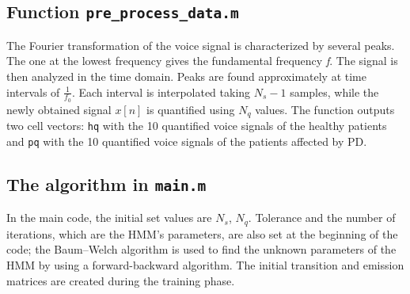 \documentclass[12pt]{article}
\begin{document}
\subsection{Function \texttt{pre\_process\_data.m}}
The Fourier transformation of the voice signal is characterized by several peaks. The one at the lowest frequency gives the fundamental frequency \textit{f}. The signal is then analyzed in the time domain. Peaks are found approximately at time intervals of $\frac{1}{f_{0}}$. Each interval is interpolated taking $N_{s}-1$ samples, while the newly obtained signal $x[n]$ is quantified using $N_{q}$ values. The function outputs two cell vectors: \texttt{hq} with the 10 quantified voice signals of the healthy patients and \texttt{pq} with the 10 quantified voice signals of the patients affected by PD.

\subsection{The algorithm in \texttt{main.m}}


In the main code, the initial set values are $N_{s}$, $N_{q}$. Tolerance and the number of iterations, which are the HMM's parameters, are also set at the beginning of the code; the Baum–Welch algorithm is used to find the unknown parameters of the HMM by using a forward-backward algorithm.
The initial transition and emission matrices are created during the training phase. 
\end{document}
